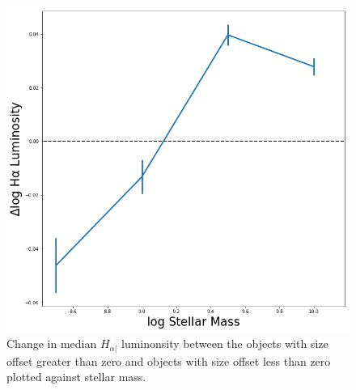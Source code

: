 \documentclass[iop]{emulateapj}
\begin{document}
\begin{figure}
	\centering
	\includegraphics[width= \columnwidth]{ratios_ha_lum.png}
	\caption{Change in median $H_{\alpha|}$ luminonsity between the objects with size offset greater than zero and objects with size offset less than zero plotted against stellar mass.}
	\label{fig:HA_lum_mass}
	
\end{figure}
\end{document}
